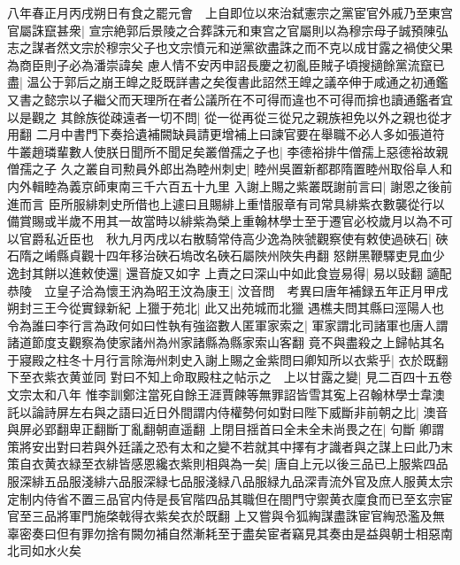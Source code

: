 八年春正月丙戌朔日有食之罷元會　上自即位以來治弑憲宗之黨宦官外戚乃至東宫官屬誅竄甚衆|{
	宣宗絶郭后景陵之合葬誅元和東宫之官屬則以為穆宗母子誠預陳弘志之謀者然文宗於穆宗父子也文宗憤元和逆黨欲盡誅之而不克以成甘露之禍使父果為商臣則子必為潘崇諱矣}
慮人情不安丙申詔長慶之初亂臣賊子頃搜擿餘黨流竄已盡|{
	温公于郭后之崩王皥之貶既詳書之矣復書此詔然王皥之議卒伸于咸通之初通鑑又書之懿宗以子繼父而天理所在者公議所在不可得而違也不可得而揜也讀通鑑者宜以是觀之}
其餘族從疎遠者一切不問|{
	從一從再從三從兄之親族袒免以外之親也從才用翻}
二月中書門下奏拾遺補闕缺員請更增補上曰諫官要在舉職不必人多如張道符牛叢趙璘輩數人使朕日聞所不聞足矣叢僧孺之子也|{
	李德裕排牛僧孺上惡德裕故親僧孺之子}
久之叢自司勲員外郎出為睦州刺史|{
	睦州吳置新都郡隋置睦州取俗阜人和内外輯睦為義京師東南三千六百五十九里}
入謝上賜之紫叢既謝前言曰|{
	謝恩之後前進而言}
臣所服緋刺史所借也上遽曰且賜緋上重惜服章有司常具緋紫衣數襲從行以備賞賜或半歲不用其一故當時以緋紫為榮上重翰林學士至于遷官必校歲月以為不可以官爵私近臣也　秋九月丙戌以右散騎常侍高少逸為陜虢觀察使有敕使過硤石|{
	硤石隋之崤縣貞觀十四年移治硤石塢改名硤石屬陜州陜失冉翻}
怒餅黑鞭驛吏見血少逸封其餅以進敕使還|{
	還音旋又如字}
上責之曰深山中如此食豈易得|{
	易以䜴翻}
讁配恭陵　立皇子洽為懷王汭為昭王汶為康王|{
	汶音問　考異曰唐年補録五年正月甲戌朔封三王今從實録新紀}
上獵于苑北|{
	此又出苑城而北獵}
遇樵夫問其縣曰涇陽人也令為誰曰李行言為政何如曰性執有強盜數人匿軍家索之|{
	軍家謂北司諸軍也唐人謂諸道節度支觀察為使家諸州為州家諸縣為縣家索山客翻}
竟不與盡殺之上歸帖其名于寢殿之柱冬十月行言除海州刺史入謝上賜之金紫問曰卿知所以衣紫乎|{
	衣於既翻下至衣紫衣黄並同}
對曰不知上命取殿柱之帖示之　上以甘露之變|{
	見二百四十五卷文宗太和八年}
惟李訓鄭注當死自餘王涯賈餗等無罪詔皆雪其寃上召翰林學士韋澳託以論詩屏左右與之語曰近日外間謂内侍權勢何如對曰陛下威斷非前朝之比|{
	澳音與屏必郢翻卑正翻斷丁亂翻朝直遥翻}
上閉目揺首曰全未全未尚畏之在|{
	句斷}
卿謂策將安出對曰若與外廷議之恐有太和之變不若就其中擇有才識者與之謀上曰此乃末策自衣黄衣緑至衣緋皆感恩纔衣紫則相與為一矣|{
	唐自上元以後三品已上服紫四品服深緋五品服淺緋六品服深緑七品服淺緑八品服緑九品深青流外官及庶人服黄太宗定制内侍省不置三品官内侍是長官階四品其職但在閤門守禦黄衣廩食而已至玄宗宦官至三品將軍門施棨戟得衣紫矣衣於既翻}
上又嘗與令狐綯謀盡誅宦官綯恐濫及無辜密奏曰但有罪勿捨有闕勿補自然漸耗至于盡矣宦者竊見其奏由是益與朝士相惡南北司如水火矣

